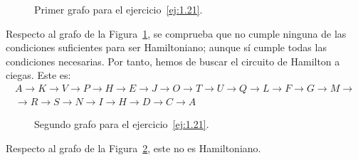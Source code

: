 \begin{ejercicio}
\begin{figure}
        
        \caption{Primer grafo para el ejercicio~\ref{ej:1.21}.}
        \label{fig:1.21_1}
    \end{figure}

    Respecto al grafo de la Figura~\ref{fig:1.21_1}, se comprueba que no cumple ninguna de las condiciones suficientes para ser Hamiltoniano; aunque sí cumple todas las condiciones necesarias. Por tanto, hemos de buscar el circuito de Hamilton a ciegas. Este es:
    \begin{multline*}
        A\to K\to V\to P\to H\to E\to J\to O\to T\to U\to Q\to L\to F\to G\to M\to\\\to R\to S\to N\to I\to H\to D\to C\to A
    \end{multline*}


    \begin{figure}
        \centering
        
        
        \caption{Segundo grafo para el ejercicio~\ref{ej:1.21}.}
        \label{fig:1.21_2}
    \end{figure}

    Respecto al grafo de la Figura~\ref{fig:1.21_2}, este no es Hamiltoniano.
\end{ejercicio}

